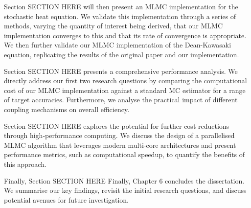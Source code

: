 Section SECTION HERE will then present an MLMC implementation for the 
stochastic heat equation. We  validate this implementation through a series of methods, 
varying the quantity of interest being derived, that our MLMC implementation 
converges to this and that its rate of convergence is appropriate. We then 
further validate our MLMC implementation of the Dean-Kawasaki equation, replicating 
the results of the original paper and our implementation.


Section SECTION HERE presents a comprehensive performance analysis. 
We directly address our first two research questions by comparing the 
computational cost of our MLMC implementation against a standard MC 
estimator for a range of target accuracies. Furthermore, we analyse 
the practical impact of different coupling mechanisms on overall efficiency.

Section SECTION HERE explores the potential for further cost reductions 
through high-performance computing. We discuss the design of a parallelised MLMC 
algorithm that leverages modern multi-core architectures and present performance 
metrics, such as computational speedup, to quantify the benefits of this approach.

Finally, Section SECTION HERE 
Finally, Chapter 6 concludes the dissertation. We summarise our key findings, 
revisit the initial research questions, and discuss potential avenues for future investigation.



 
